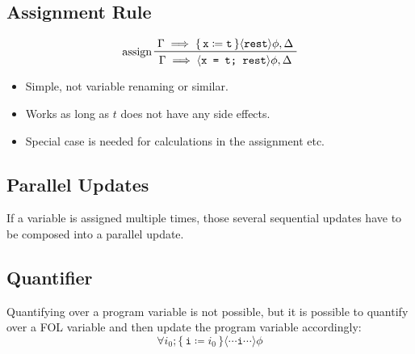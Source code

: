 		\subsection{Assignment Rule}
			\begin{equation*}
				\prftree[l]
					{assign}
					{\Gamma \implies \{\, \texttt{x} \coloneqq \texttt{t} \,\} \langle \texttt{rest} \rangle \phi, \Delta}
					{\Gamma \implies \langle \texttt{x = t; rest} \rangle \phi, \Delta}
			\end{equation*}
			
			\begin{itemize}
				\item Simple, not variable renaming or similar.
				\item Works as long as \(t\) does not have any side effects.
				\item Special case is needed for calculations in the assignment etc.
			\end{itemize}

		\subsection{Parallel Updates}
			If a variable is assigned multiple times, those several sequential updates have to be composed into a parallel update.
			
		

		\subsection{Quantifier}
			Quantifying over a program variable is not possible, but it is possible to quantify over a FOL variable and then update the program variable accordingly:
			\begin{equation*}
				\forall i_0; \{\, \texttt{i} \coloneqq i_0 \,\} \langle \cdots \texttt{i} \cdots \rangle \phi
			\end{equation*}

